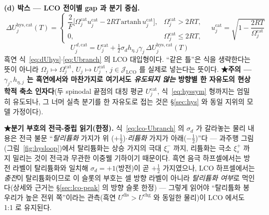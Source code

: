 \documentclass[11pt,a4paper]{article}
\newcommand{\dis}{\mathrm{dis}}
\newcommand{\chg}{\mathrm{chg}}
\newcommand{\hys}{\mathrm{hys}}
\begin{document}
\textbf{(d) 박스 — LCO 전이별 gap 과 분기 중심.}
\begin{equation}
\boxed{\;
\Delta U_j^{\hys,\mathrm{cat}}(T)=
\begin{cases}
\dfrac{2}{F}\big[\Omega_j^\mathrm{cat}u_j^\mathrm{cat}-2RT\,\mathrm{artanh}\,u_j^\mathrm{cat}\big],
& \Omega_j^\mathrm{cat}>2RT,\\[4pt]
0, & \Omega_j^\mathrm{cat}\le2RT,
\end{cases}
\quad u_j^\mathrm{cat}=\sqrt{1-\dfrac{2RT}{\Omega_j^\mathrm{cat}}}\;}
\label{eq:lco-dUhys}
\end{equation}
\begin{equation}
\boxed{\;
U_j^{\,d,\mathrm{cat}}=U_j^\mathrm{cat}
+\tfrac12\sigma_d h_{\eta,j}\gamma_j\,\Delta U_j^{\hys,\mathrm{cat}}(T)\;}
\label{eq:lco-Ubranch}
\end{equation}
흑연 식~\eqref{eq:dUhys}$\cdot$\eqref{eq:Ubranch} 의 LCO 대입형이다. ``같은 틀''은 식을 생략한다는 뜻이
아니라 $\Omega_j\mapsto\Omega_j^\mathrm{cat}$, $U_j\mapsto U_j^\mathrm{cat}$, $j\in\mathcal J_\mathrm{LCO}$
를 실제로 넣는다는 뜻이다. \textbf{★주의 — $\gamma_j,h_{\eta,j}$ 는 흑연에서와 마찬가지로 여기서도
\emph{유도되지 않는} 방향별 한 자유도의 현상학적 축소 인자다}(두 spinodal 끝점의 대칭 평균
$U_j^\mathrm{cat}$, 식~\eqref{eq:hyssym} 형까지는 엄밀히 유도되나, 그 너머 실측 분기를 한 자유도로 접는
것은 \S\ref{sec:hys} 와 동일 지위의 모델 가정이다).

\textbf{★분기 부호의 전극-중립 읽기(한정).}
식~\eqref{eq:lco-Ubranch} 의 $\sigma_d$ 가 갈라놓는 물리 내용은 전극 불문 ``\emph{탈리튬화} 가지가 위
($+\tfrac12$)$\cdot$\emph{리튬화} 가지가 아래($-\tfrac12$)''다 — 과주행 그림(그림~\ref{fig:hysloop})에서
탈리튬화는 상승 가지의 극대 $\xi_s^-$ 까지, 리튬화는 극소 $\xi_s^+$ 까지 밀리는 것이 전극과 무관한 이중웰
기하이기 때문이다. 흑연 음극 하프셀에서는 방전 라벨이 탈리튬화와 일치해 $\sigma_d=+1$(방전)이 곧
$+\tfrac12$ 가지였으나, LCO 하프셀에서는 \emph{충전}이 탈리튬화이므로 이 슬롯의 부호는 셀 방향 라벨이
아니라 \emph{탈리튬화 여부}로 먹인다(상세와 근거는 \S\ref{sec:lco-peak} 의 방향 슬롯 한정) — 그렇게
읽어야 ``탈리튬화 봉우리가 높은 전위 쪽''이라는 관측(흑연 $U^{\dis}>U^{\chg}$ 와 동일한 물리)이 LCO
에서도 1:1 로 유지된다.
\end{document}
